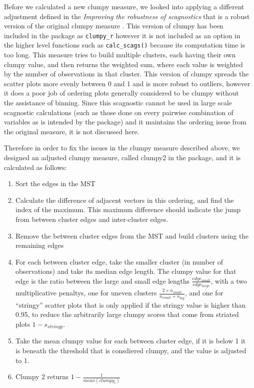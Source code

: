 Before we calculated a new clumpy measure, we looked into applying a
different adjustment defined in the \emph{Improving the robustness of
scagnostics} that is a robust version of the original clumpy measure
\citep{robust}. This version of clumpy has been included in the package
as \texttt{clumpy\_r} however it is not included as an option in the
higher level functions such as \texttt{calc\_scags()} because its
computation time is too long. This measure tries to build multiple
clusters, each having their own clumpy value, and then returns the
weighted sum, where each value is weighted by the number of observations
in that cluster. This version of clumpy spreads the scatter plots more
evenly between 0 and 1 and is more robust to outliers, however it does a
poor job of ordering plots generally considered to be clumpy without the
assistance of binning. Since this scagnostic cannot be used in large
scale scagnostic calculations (such as those done on every pairwise
combination of variables as is intended by the package) and it maintains
the ordering issue from the original measure, it is not discussed here.

Therefore in order to fix the issues in the clumpy measure described
above, we designed an adjusted clumpy measure, called clumpy2 in the
package, and it is calculated as follows:

\begin{enumerate}
\def\labelenumi{\arabic{enumi}.}
\tightlist
\item
  Sort the edges in the MST
\item
  Calculate the difference of adjacent vectors in this ordering, and
  find the index of the maximum. This maximum difference should indicate
  the jump from between cluster edges and inter-cluster edges.
\item
  Remove the between cluster edges from the MST and build clusters using
  the remaining edges
\item
  For each between cluster edge, take the smaller cluster (in number of
  observations) and take its median edge length. The clumpy value for
  that edge is the ratio between the large and small edge lengths
  \(\frac{edge_{small}}{edge_{large}}\), with a two multiplicative
  penaltys, one for uneven clusters
  \(\frac{2\times n_{small}}{n_{small}+n_{big}}\), and one for
  ``stringy'' scatter plots that is only applied if the stringy value is
  higher than 0.95, to reduce the arbitrarily large clumpy scores that
  come from striated plots \(1-s_{stringy}\).
\item
  Take the mean clumpy value for each between cluster edge, if it is
  below 1 it is beneath the threshold that is consdiered clumpy, and the
  value is adjusted to 1.
\item
  Clumpy 2 returns \(1-\frac{1}{mean(clumpy_i)}\)
\end{enumerate}

